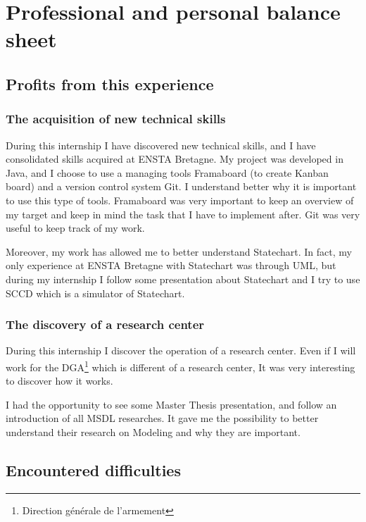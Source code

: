 
\chapter{Professional and personal balance sheet}

\section{Profits from this experience}

\subsection{The acquisition of new technical skills}

During this internship I have discovered new technical skills, and I have consolidated skills acquired at ENSTA Bretagne. My project was developed in Java, and I choose to use a managing tools Framaboard (to create Kanban board) and a version control system Git. I understand better why it is important to use this type of tools. Framaboard was very important to keep an overview of my target and keep in mind the task that I have to implement after. Git was very useful to keep track of my work.

Moreover, my work has allowed me to better understand Statechart. In fact, my only experience at ENSTA Bretagne with Statechart was through UML, but during my internship I follow some presentation about Statechart and I try to use SCCD which is a simulator of Statechart.



\subsection{The discovery of a research center}

During this internship I discover the operation of a research center. Even if I will work for the DGA\footnote{Direction générale de l'armement} which is different of a research center, It was very interesting to discover how it works.

I had the opportunity to see some Master Thesis presentation, and follow an introduction of all MSDL researches. It gave me the possibility to better understand their research on Modeling and why they are important.


\section{Encountered difficulties}

